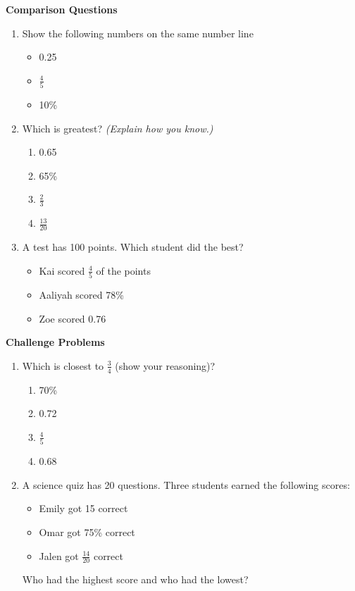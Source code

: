 \documentclass[
  letterpaper,
  DIV=11,
  numbers=noendperiod]{scrreprt}
\providecommand{\tightlist}{%
  \setlength{\itemsep}{0pt}\setlength{\parskip}{0pt}}
\begin{document}
\textbf{Comparison Questions}

\begin{enumerate}
\def\labelenumi{\arabic{enumi}.}
\setcounter{enumi}{4}
\item
  Show the following numbers on the same number line

  \begin{itemize}
  \tightlist
  \item
    0.25
  \item
    \(\frac{4}{5}\)
  \item
    10\%
  \end{itemize}
\item
  Which is greatest? \emph{(Explain how you know.)}

  \begin{enumerate}
  \def\labelenumii{\alph{enumii}.}
  \tightlist
  \item
    0.65
  \item
    65\%
  \item
    \(\frac{2}{3}\)
  \item
    \(\frac{13}{20}\)
  \end{enumerate}
\item
  A test has 100 points. Which student did the best?

  \begin{itemize}
  \tightlist
  \item
    Kai scored \(\frac{4}{5}\) of the points
  \item
    Aaliyah scored 78\%
  \item
    Zoe scored 0.76
  \end{itemize}
\end{enumerate}

\textbf{Challenge Problems}

\begin{enumerate}
\def\labelenumi{\arabic{enumi}.}
\setcounter{enumi}{7}
\item
  Which is closest to \(\frac{3}{4}\) (show your reasoning)?

  \begin{enumerate}
  \def\labelenumii{\alph{enumii}.}
  \tightlist
  \item
    70\%
  \item
    0.72
  \item
    \(\frac{4}{5}\)
  \item
    0.68
  \end{enumerate}
\item
  A science quiz has 20 questions. Three students earned the following
  scores:

  \begin{itemize}
  \tightlist
  \item
    Emily got 15 correct
  \item
    Omar got 75\% correct
  \item
    Jalen got \(\frac{14}{20}\) correct
  \end{itemize}

  Who had the highest score and who had the lowest?
\end{enumerate}
\end{document}
